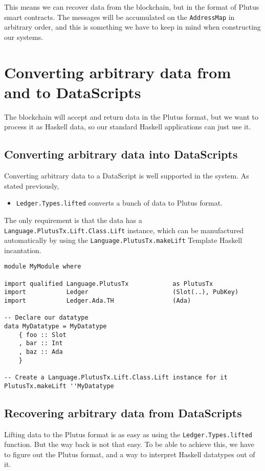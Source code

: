 \documentclass{article}
\begin{document}
This means we can recover data from the blockchain, but in the format of Plutus smart contracts. The messages will be accumulated on the \verb|AddressMap|\cite{address-map} in arbitrary order, and this is something we have to keep in mind when constructing our systems.

\section{Converting arbitrary data from and to DataScripts}
The blockchain will accept and return data in the Plutus format, but we want to process it as Haskell data, so our standard Haskell applications can just use it.

\subsection{Converting arbitrary data into DataScripts}
Converting arbitrary data to a DataScript is well supported in the system. As stated previously,
\nopagebreak
\begin{itemize}
\item \verb|Ledger.Types.lifted| converts a bunch of data to Plutus format.
\end{itemize}

The only requirement is that the data has a \verb|Language.PlutusTx.Lift.Class.Lift| instance, which can be manufactured automatically by using the \verb|Language.PlutusTx.makeLift| Template Haskell incantation.
\nopagebreak
\begin{verbatim}
module MyModule where

import qualified Language.PlutusTx            as PlutusTx
import           Ledger                       (Slot(..), PubKey)
import           Ledger.Ada.TH                (Ada)

-- Declare our datatype
data MyDatatype = MyDatatype
    { foo :: Slot
    , bar :: Int
    , baz :: Ada
    }

-- Create a Language.PlutusTx.Lift.Class.Lift instance for it
PlutusTx.makeLift ''MyDatatype
\end{verbatim}

\subsection{Recovering arbitrary data from DataScripts}
Lifting data to the Plutus format is as easy as using the \verb|Ledger.Types.lifted| function. But the way back is not that easy. To be able to achieve this, we have to figure out the Plutus format, and a way to interpret Haskell datatypes out of it.
\end{document}
